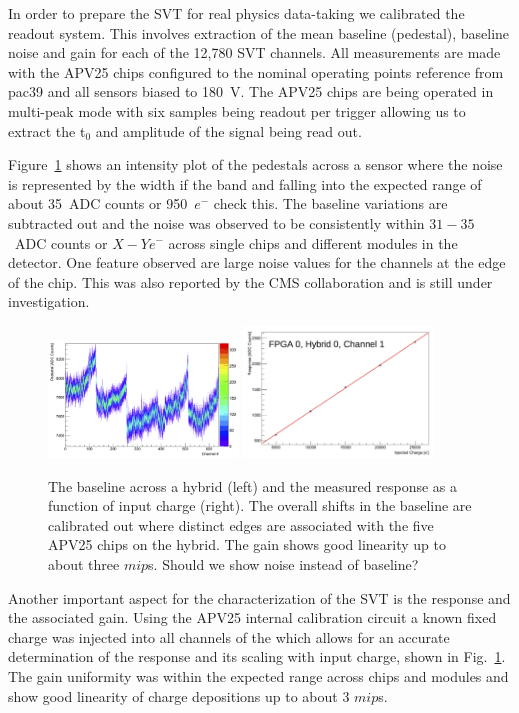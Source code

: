 In order to prepare the SVT for real physics data-taking we calibrated the readout system.
This involves extraction of the mean baseline (pedestal), baseline noise and gain for each of the 
12,780 SVT channels. All measurements are made with the APV25 chips configured to the nominal 
operating points {\color{red} reference from pac39} and all sensors biased to 180~V. 
The APV25 chips are being operated in multi-peak mode with six samples being readout per trigger 
allowing us to extract the  t$_{0}$ and amplitude of the signal being read out.


Figure~\ref{fig:baseline_and_gain} shows an intensity plot of the pedestals across a sensor where the noise is represented 
by the width if the band and falling into the expected range of about 35~ADC counts or 950~$e^{-}$ 
{\color{red} check this}. The baseline variations are subtracted out and the noise was observed to 
be consistently within $31-35$~ADC counts or $X-Ye^{-}$ across single chips and 
different modules in the detector. One feature observed are large noise values for the channels 
at the edge of the chip. This was also reported by the CMS collaboration and is still under 
investigation.
\begin{figure}[]
	\includegraphics[width=0.45\textwidth]{test2012/svtperformance/baseline}
	\includegraphics[width=0.45\textwidth]{test2012/svtperformance/gain}
	\caption{\small{The baseline across a hybrid (left) and the measured response as a function of 
	input charge (right). The overall shifts in the baseline are calibrated out where distinct edges 
	are associated with the five APV25 chips on the hybrid. The gain shows good linearity up to 
	about three $mip$s.} {\color{red}Should we show noise instead of baseline?}}
	\label{fig:baseline_and_gain}
\end{figure}
Another important aspect for the characterization of the SVT is the response and the associated 
gain. Using the APV25 internal calibration circuit a known fixed charge was injected into all 
channels of the which allows for an accurate determination of the response and its 
scaling with input charge, shown in Fig.~\ref{fig:baseline_and_gain}. The gain uniformity was 
within the expected range across chips and modules and show good linearity of charge 
depositions up to about 3 $mip$s. 

